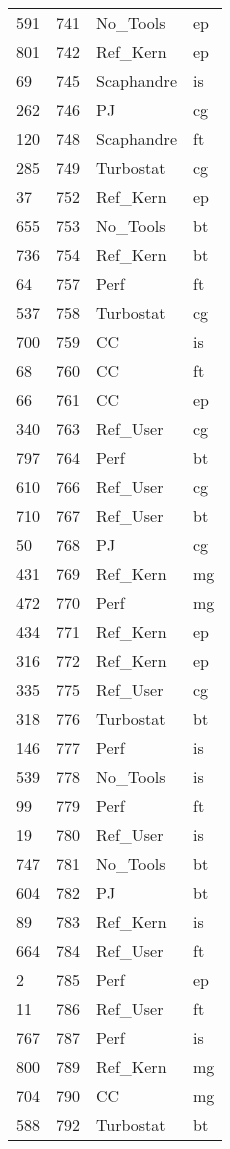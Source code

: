 \begin{tabular}{lrll}
591 & 741 & No_Tools & ep \\
801 & 742 & Ref_Kern & ep \\
69 & 745 & Scaphandre & is \\
262 & 746 & PJ & cg \\
120 & 748 & Scaphandre & ft \\
285 & 749 & Turbostat & cg \\
37 & 752 & Ref_Kern & ep \\
655 & 753 & No_Tools & bt \\
736 & 754 & Ref_Kern & bt \\
64 & 757 & Perf & ft \\
537 & 758 & Turbostat & cg \\
700 & 759 & CC & is \\
68 & 760 & CC & ft \\
66 & 761 & CC & ep \\
340 & 763 & Ref_User & cg \\
797 & 764 & Perf & bt \\
610 & 766 & Ref_User & cg \\
710 & 767 & Ref_User & bt \\
50 & 768 & PJ & cg \\
431 & 769 & Ref_Kern & mg \\
472 & 770 & Perf & mg \\
434 & 771 & Ref_Kern & ep \\
316 & 772 & Ref_Kern & ep \\
335 & 775 & Ref_User & cg \\
318 & 776 & Turbostat & bt \\
146 & 777 & Perf & is \\
539 & 778 & No_Tools & is \\
99 & 779 & Perf & ft \\
19 & 780 & Ref_User & is \\
747 & 781 & No_Tools & bt \\
604 & 782 & PJ & bt \\
89 & 783 & Ref_Kern & is \\
664 & 784 & Ref_User & ft \\
2 & 785 & Perf & ep \\
11 & 786 & Ref_User & ft \\
767 & 787 & Perf & is \\
800 & 789 & Ref_Kern & mg \\
704 & 790 & CC & mg \\
588 & 792 & Turbostat & bt \\

\end{tabular}

